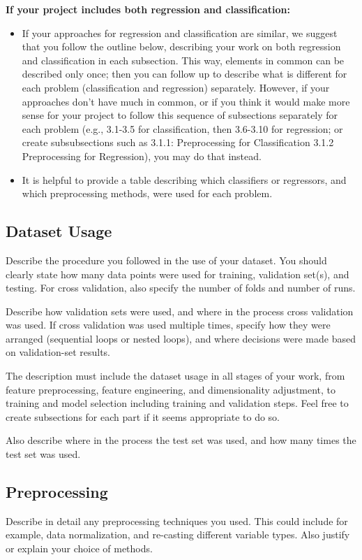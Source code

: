 \documentclass[singlecolumn]{article}
\begin{document}
\textbf{If your project includes both regression and classification:}
\begin{itemize}
	\item If your approaches for regression and classification are similar, we suggest that you follow the outline below, describing your work on both regression and classification in each subsection. This way, elements in common can be described only once; then you can follow up to describe what is different for each problem (classification and regression) separately.  However, if your approaches don’t have much in common, or if you think it would make more sense for your project to follow this sequence of subsections separately for each problem (e.g., 3.1-3.5 for classification, then 3.6-3.10 for regression; or create subsubsections such as 3.1.1: Preprocessing for Classification 3.1.2 Preprocessing for Regression), you may do that instead.  
	\item It is helpful to provide a table describing which classifiers or regressors, and which preprocessing methods, were used for each problem.
\end{itemize}

\subsection{Dataset Usage}
Describe the procedure you followed in the use of your dataset. You should clearly state how many data points were used for training, validation set(s), and testing. For cross validation, also specify the number of folds and number of runs. 

Describe how validation sets were used, and where in the process cross validation was used.  If cross validation was used multiple times, specify how they were arranged (sequential loops or nested loops), and where decisions were made based on validation-set results.

The description must include the dataset usage in all stages of your work, from feature preprocessing, feature engineering, and dimensionality adjustment, to training and model selection including training and validation steps. Feel free to create subsections for each part if it seems appropriate to do so.

Also describe where in the process the test set was used, and how many times the test set was used.

\subsection{Preprocessing}
Describe in detail any preprocessing techniques you used.  This could include for example, data normalization, and re-casting different variable types.  Also justify or explain your choice of methods.
\end{document}
